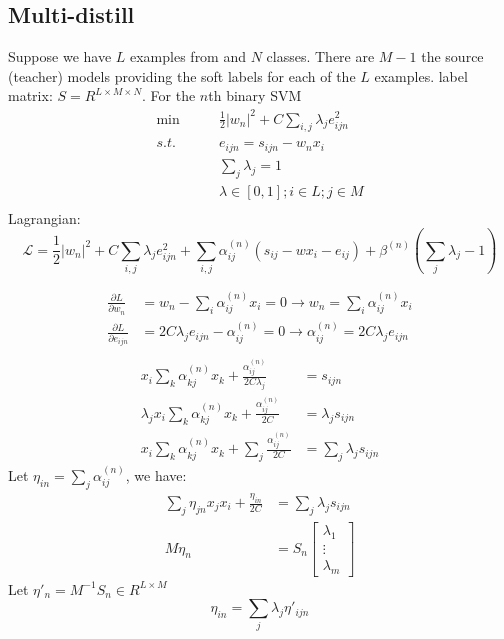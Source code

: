 \subsection{Multi-distill}
Suppose we have $L$ examples from and $N$ classes. There are $M-1$ the source (teacher) models providing the soft labels for each of the $L$ examples.
label matrix: $S = R^{L\times M \times N}$. 
For the $n$th binary SVM 
\begin{equation}
\begin{aligned}
\min \qquad & \frac{1}{2}{\left| w_n \right|^2} + C\sum_{i,j} \lambda_j{e_{ijn}^2} \\
s.t.\qquad& e_{ijn} = s_{ijn} - w_nx_i\\
& \sum_j\lambda_j=1\\
& \lambda \in [0,1]; i\in L;  j\in M\\
\end{aligned}  
\end{equation}
Lagrangian:
\begin{equation}
\mathcal{L}=\frac{1}{2}{\left| w_n \right|^2} + C\sum_{i,j} \lambda_j{e_{ijn}^2}+\sum_{i,j}\alpha^{(n)}_{ij}\left(s_{ij} - wx_i-e_{ij}\right)+\beta^{(n)}\left(\sum_j\lambda_j-1\right)
\end{equation}

\begin{equation}
\begin{aligned}
\frac{{\partial L}}{{\partial w_n}}& = w_n - \sum_{i}\alpha^{(n)}_{ij} {x_i}=0 \rightarrow w_n = \sum_{i}\alpha^{(n)}_{ij} {x_i}\\
\frac{{\partial L}}{{\partial {e_{ijn}}}} & = 2C\lambda_j {e_{ijn}} - {\alpha^{(n)} _{ij}}=0 \rightarrow \alpha^{(n)}_{ij} = 2C\lambda_j {e_{ijn}}\\
\end{aligned}
\end{equation}
\begin{equation}
\begin{aligned}
x_i\sum_{k}\alpha^{(n)}_{kj}x_k+\frac{\alpha^{(n)}_{ij}}{2C\lambda_j}&=s_{ijn}\\
\lambda_jx_i\sum_{k}\alpha^{(n)}_{kj}x_k+\frac{\alpha^{(n)}_{ij}}{2C}&=\lambda_js_{ijn}\\
x_i\sum_{k}\alpha^{(n)}_{kj}x_k+\sum_j\frac{\alpha^{(n)}_{ij}}{2C}&=\sum_j\lambda_js_{ijn}
\end{aligned}
\end{equation}
Let $\eta_{in}=\sum_j\alpha^{(n)}_{ij}$, we have:
\begin{equation}
\begin{aligned}
\sum_j\eta_{jn}x_jx_i+\frac{\eta_{in}}{2C}&=\sum_j\lambda_js_{ijn}\\
M\eta_n&=S_n\begin{bmatrix}
\lambda_1\\\vdots\\\lambda_m
\end{bmatrix}
\end{aligned}
\end{equation}
Let ${\eta}'_{n}=M^{-1}S_n \in R^{L\times M}$
\[\eta_{in}=\sum_j\lambda_j{\eta}'_{ijn}\]

